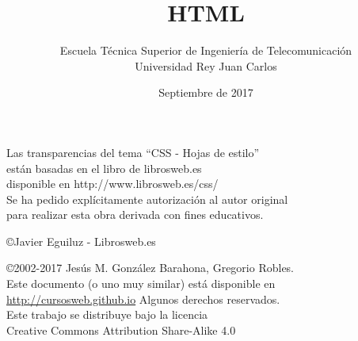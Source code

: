 \documentclass[ucs]{beamer}
\begin{document}
\title[HTML]{HTML }
\author[GSyC]{Escuela Técnica Superior de Ingeniería de Telecomunicación\\
Universidad Rey Juan Carlos}
\date[2017]{Septiembre de 2017}


\begin{frame}
  \titlepage
\end{frame}



\begin{frame}[b]



\vspace{1cm}
\begin{footnotesize}

\begin{flushright}
Las transparencias del tema ``CSS - Hojas de estilo'' \\
están basadas en el libro de librosweb.es \\
disponible en http://www.librosweb.es/css/ \\
Se ha pedido explícitamente autorización al autor original \\
para realizar esta obra derivada con fines educativos.

\copyright Javier Eguiluz - Librosweb.es \\
\vspace{1cm}
\end{flushright}



\begin{flushright}
{
\copyright 2002-2017 Jesús M. González Barahona, Gregorio Robles. \\

Este documento (o uno muy similar) está disponible en \\
\url{http://cursosweb.github.io}
  Algunos derechos reservados. \\
  Este trabajo se distribuye bajo la licencia \\
  Creative Commons Attribution Share-Alike 4.0\\
}
\end{flushright}  


\end{footnotesize}
\end{frame}
\end{document}
